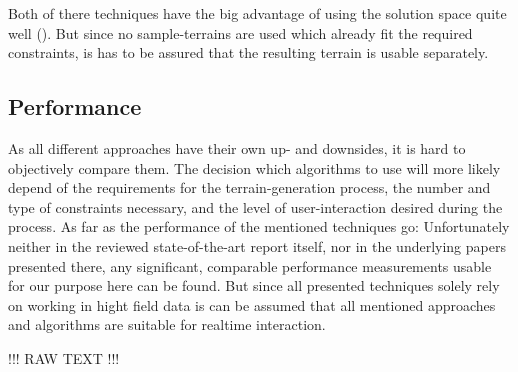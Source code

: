 Both of there techniques have the big advantage of using the solution space quite well (). But since no sample-terrains are used which already fit the required constraints, is has to be assured that the resulting terrain is usable separately.

\subsection{Performance}
As all different approaches have their own up- and downsides, it is hard to objectively compare them. The decision which algorithms to use will more likely depend of the requirements for the terrain-generation process, the number and type of constraints necessary, and the level of user-interaction desired during the process. As far as the performance of the mentioned techniques go: Unfortunately neither in the reviewed state-of-the-art report itself, nor in the underlying papers presented there, any significant, comparable performance measurements usable for our purpose here can be found. But since all presented techniques solely rely on working in hight field data is can be assumed that all mentioned approaches and algorithms are suitable for realtime interaction.

!!! RAW TEXT !!!
